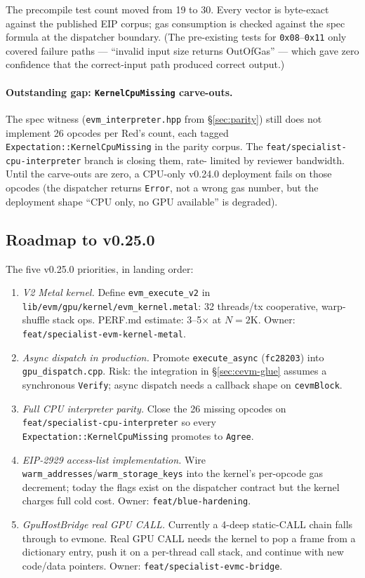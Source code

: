 The precompile test count moved from 19 to 30. Every vector is byte-exact
against the published EIP corpus; gas consumption is checked against the
spec formula at the dispatcher boundary. (The pre-existing tests for
\texttt{0x08}--\texttt{0x11} only covered failure paths --- ``invalid
input size returns OutOfGas'' --- which gave zero confidence that the
correct-input path produced correct output.)

\paragraph{Outstanding gap: \texttt{KernelCpuMissing} carve-outs.} The
spec witness (\texttt{evm\_interpreter.hpp} from \S\ref{sec:parity})
still does not implement 26 opcodes per Red's count, each tagged
\texttt{Expectation::KernelCpuMissing} in the parity corpus. The
\texttt{feat/specialist-cpu-interpreter} branch is closing them, rate-
limited by reviewer bandwidth. Until the carve-outs are zero, a CPU-only
v0.24.0 deployment fails on those opcodes (the dispatcher returns
\texttt{Error}, not a wrong gas number, but the deployment shape ``CPU
only, no GPU available'' is degraded).

\subsection{Roadmap to v0.25.0}
\label{sec:v024:roadmap}

The five v0.25.0 priorities, in landing order:

\begin{enumerate}
  \item \emph{V2 Metal kernel.} Define \texttt{evm\_execute\_v2} in
    \texttt{lib/evm/gpu/kernel/evm\_kernel.metal}: 32 threads/tx
    cooperative, warp-shuffle stack ops. PERF.md estimate:
    3--5$\times$ at $N=2$K. Owner:
    \texttt{feat/specialist-evm-kernel-metal}.
  \item \emph{Async dispatch in production.} Promote
    \texttt{execute\_async} (\texttt{fc28203}) into
    \texttt{gpu\_dispatch.cpp}. Risk: the integration in
    \S\ref{sec:cevm-glue} assumes a synchronous \texttt{Verify};
    async dispatch needs a callback shape on \texttt{cevmBlock}.
  \item \emph{Full CPU interpreter parity.} Close the 26 missing
    opcodes on \texttt{feat/specialist-cpu-interpreter} so every
    \texttt{Expectation::KernelCpuMissing} promotes to
    \texttt{Agree}.
  \item \emph{EIP-2929 access-list implementation.} Wire
    \texttt{warm\_addresses}/\texttt{warm\_storage\_keys} into the
    kernel's per-opcode gas decrement; today the flags exist on the
    dispatcher contract but the kernel charges full cold cost. Owner:
    \texttt{feat/blue-hardening}.
  \item \emph{GpuHostBridge real GPU CALL.} Currently a 4-deep
    static-CALL chain falls through to evmone. Real GPU CALL needs
    the kernel to pop a frame from a dictionary entry, push it on a
    per-thread call stack, and continue with new code/data pointers.
    Owner: \texttt{feat/specialist-evmc-bridge}.
\end{enumerate}

